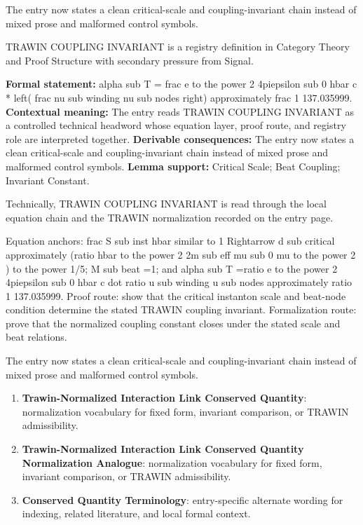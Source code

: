 The entry now states a clean critical-scale and coupling-invariant chain instead of mixed prose and malformed control symbols.
\clearpage


\begingroup\small
{}
TRAWIN COUPLING INVARIANT is a registry definition in Category Theory and Proof Structure with secondary pressure from Signal.

\begingroup\footnotesize\setlength{\emergencystretch}{3em}\sloppy
\textbf{Formal statement:} alpha sub T = frac e to the power 2 4piepsilon sub 0 hbar c * left( frac nu sub winding nu sub nodes right) approximately frac 1 137.035999. \textbf{Contextual meaning:} The entry reads TRAWIN COUPLING INVARIANT as a controlled technical headword whose equation layer, proof route, and registry role are interpreted together. \textbf{Derivable consequences:} The entry now states a clean critical-scale and coupling-invariant chain instead of mixed prose and malformed control symbols. \textbf{Lemma support:} Critical Scale; Beat Coupling; Invariant Constant.\par
\endgroup

Technically, TRAWIN COUPLING INVARIANT is read through the local equation chain and the TRAWIN normalization recorded on the entry page.

Equation anchors: frac S sub inst hbar similar to 1 Rightarrow d sub critical approximately (ratio hbar to the power 2 2m sub eff mu sub 0 mu to the power 2 ) to the power 1/5; M sub beat =1; and alpha sub T =ratio e to the power 2 4piepsilon sub 0 hbar c dot ratio u sub winding u sub nodes approximately ratio 1 137.035999. Proof route: show that the critical instanton scale and beat-node condition determine the stated TRAWIN coupling invariant. Formalization route: prove that the normalized coupling constant closes under the stated scale and beat relations.

The entry now states a clean critical-scale and coupling-invariant chain instead of mixed prose and malformed control symbols.
\endgroup

\begin{enumerate}[leftmargin=1.6em,itemsep=6pt,topsep=4pt]
\item \textbf{Trawin-Normalized Interaction Link Conserved Quantity}: normalization vocabulary for fixed form, invariant comparison, or TRAWIN admissibility.
\item \textbf{Trawin-Normalized Interaction Link Conserved Quantity Normalization Analogue}: normalization vocabulary for fixed form, invariant comparison, or TRAWIN admissibility.
\item \textbf{Conserved Quantity Terminology}: entry-specific alternate wording for indexing, related literature, and local formal context.
\end{enumerate}

